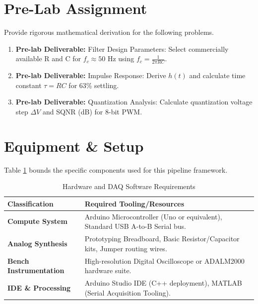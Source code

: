 \documentclass[11pt,letterpaper]{article}
\providecommand{\pldECE}[1]{\textcolor{BrickRed}{\textbf{Pre-lab Deliverable:} #1}}
\begin{document}
\clearpage

\section{Pre-Lab Assignment}

Provide rigorous mathematical derivation for the following problems. 

\begin{enumerate}
    \item \pldECE{Filter Design Parameters:} Select commercially available R and C for $f_c \approx 50$ Hz using $f_c = \frac{1}{2\pi RC}$.
    
    \item \pldECE{Impulse Response:} Derive $h(t)$ and calculate time constant $\tau = RC$ for 63\% settling.
    
    \item \pldECE{Quantization Analysis:} Calculate quantization voltage step $\Delta V$ and SQNR (dB) for 8-bit PWM.
\end{enumerate}

\clearpage

\section{Equipment \& Setup}
Table \ref{tab:equipment} bounds the specific components used for this pipeline framework.

\begin{table}[H]
    \centering
    \caption{Hardware and DAQ Software Requirements}
    \label{tab:equipment}
    \begin{tabularx}{\linewidth}{l X}
    \toprule
    \textbf{Classification} & \textbf{Required Tooling/Resources}\\
    \midrule
    \textbf{Compute System} & Arduino Microcontroller (Uno or equivalent), Standard USB A-to-B Serial bus.\\
    \textbf{Analog Synthesis} & Prototyping Breadboard, Basic Resistor/Capacitor kits, Jumper routing wires.\\
    \textbf{Bench Instrumentation} & High-resolution Digital Oscilloscope or ADALM2000 hardware suite.\\
    \textbf{IDE \& Processing} & Arduino Studio IDE (C++ deployment), MATLAB (Serial Acquisition Tooling).\\
    \bottomrule
    \end{tabularx}
\end{table}
\end{document}

